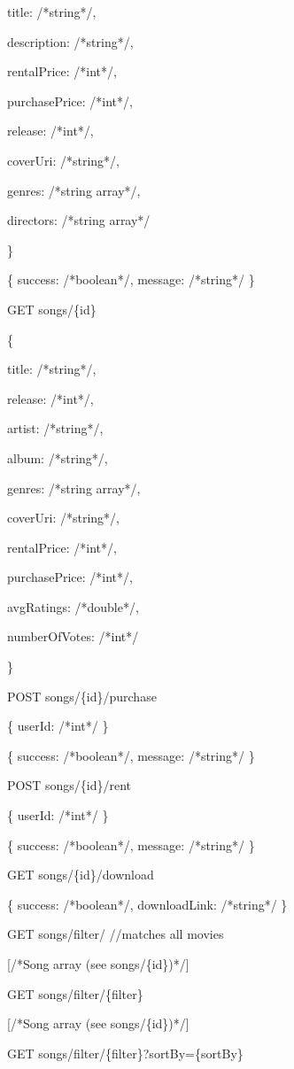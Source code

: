          title: /*string*/,

         description: /*string*/,

         rentalPrice: /*int*/,

         purchasePrice: /*int*/,

         release: /*int*/,

         coverUri: /*string*/,

         genres: /*string array*/,

         directors: /*string array*/

    \}

    \{ success: /*boolean*/, message: /*string*/ \}

GET  songs/\{id\}

    \{

        title: /*string*/,

        release: /*int*/,

        artist: /*string*/,

        album: /*string*/,

        genres: /*string array*/,

        coverUri: /*string*/,

        rentalPrice: /*int*/,

        purchasePrice: /*int*/,

        avgRatings: /*double*/,

        numberOfVotes: /*int*/

       \}

POST songs/\{id\}/purchase

    \{ userId: /*int*/ \}

    \{ success: /*boolean*/, message: /*string*/ \}

POST songs/\{id\}/rent

    \{ userId: /*int*/ \}

    \{ success: /*boolean*/, message: /*string*/ \}

GET  songs/\{id\}/download

    \{ success: /*boolean*/, downloadLink: /*string*/ \}

GET  songs/filter/                    //matches all movies

    [/*Song array (see songs/\{id\})*/]

GET  songs/filter/\{filter\}

    [/*Song array (see songs/\{id\})*/]

GET  songs/filter/\{filter\}?sortBy=\{sortBy\}

